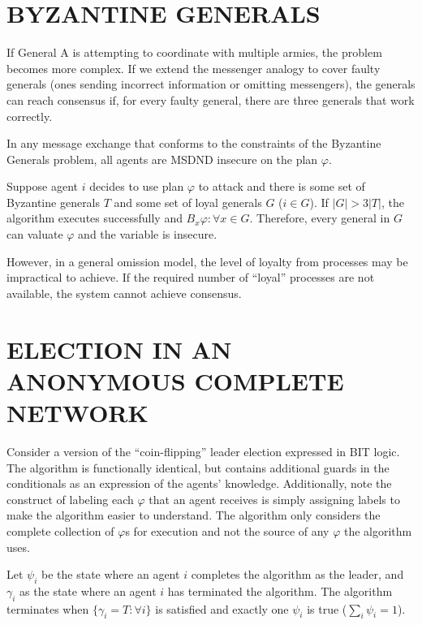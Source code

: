 \section{BYZANTINE GENERALS}

If General A is attempting to coordinate with multiple armies, the problem becomes more complex.
If we extend the messenger analogy to cover faulty generals (ones sending incorrect information or omitting messengers), the generals can reach consensus if, for every faulty general, there are three generals that work correctly.\cite{byzantine-generals}

\begin{thm}
In any message exchange that conforms to the constraints of the Byzantine Generals problem, all agents are MSDND insecure on the plan $\varphi$.
\end{thm}
\begin{prooftight}
Suppose agent $i$ decides to use plan $\varphi$ to attack and there is some set of Byzantine generals $T$ and some set of loyal generals $G$ ($i \in G$). If $|G| > 3|T|$, the algorithm executes successfully and $B_x \varphi : \forall x \in G$. Therefore, every general in $G$ can valuate $\varphi$ and the variable is insecure.
\end{prooftight}

However, in a general omission model, the level of loyalty from processes may be impractical to achieve.
If the required number of ``loyal'' processes are not available, the system cannot achieve consensus.

\section{ELECTION IN AN ANONYMOUS COMPLETE NETWORK}

Consider a version of the ``coin-flipping'' leader election expressed in BIT logic.
The algorithm is functionally identical, but contains additional guards in the conditionals as an expression of the agents' knowledge.
Additionally, note the construct of labeling each $\varphi$ that an agent receives is simply assigning labels to make the algorithm easier to understand.
The algorithm only considers the complete collection of $\varphi$s for execution and not the source of any $\varphi$ the algorithm uses.

Let $\psi_i$ be the state where an agent $i$ completes the algorithm as the leader, and $\gamma_i$ as the state where an agent $i$ has terminated the algorithm.
The algorithm terminates when $\{\gamma_i = T : \forall i \}$ is satisfied and exactly one $\psi_i$ is true ($\sum_i \psi_i = 1$).

